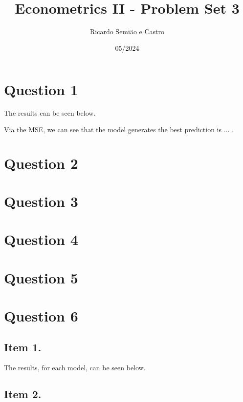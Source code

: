 \documentclass[12pt]{article}
\title{Econometrics II - Problem Set 3}
\author{Ricardo Semião e Castro}
\date{05/2024}
\begin{document}
\maketitle


\section*{Question 1}

The results can be seen below.



Via the MSE, we can see that the model generates the best prediction is ... .


\section*{Question 2}



\section*{Question 3}



\section*{Question 4}



\section*{Question 5}



\section*{Question 6}

\subsection*{Item 1.}

The results, for each model, can be seen below.






\subsection*{Item 2.}
\end{document}
